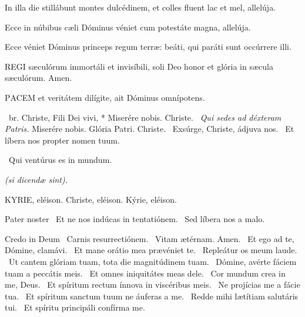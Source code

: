 
  In illa die stillábunt montes dulcédinem, et colles fluent lac et mel, allelúja.

  Ecce in núbibus cæli Dóminus véniet cum potestáte magna, allelúja.

  Ecce véniet Dóminus princeps regum terræ: beáti, qui paráti sunt occúrrere illi.



\lettrine[lines=2]{R}{EGI} sæculórum immortáli et invisíbili, soli Deo honor et glória in sæcula sæculórum. Amen.



\lettrine[lines=2]{P}{ACEM} et veritátem dilígite, ait Dóminus omnípotens.

\R\ br. Christe, Fili Dei vivi, * Miserére nobis. Christe. \V\ \textit{Qui sedes ad déxteram Patris.} Miserére nobis. Glória Patri. Christe. \V\ Exsúrge, Christe, ádjuva nos. \R\ Et líbera nos propter nomen tuum.

 \V\ Qui ventúrus es in mundum.


\textit{(si dicendæ sint).}

KYRIE, eléison. Christe, eléison. Kýrie, eléison.

Pater noster  \V\ Et ne nos indúcas in tentatiónem. \R\ Sed líbera nos a malo.

Credo in Deum  \V\ Carnis resurrectiónem. \R\ Vitam ætérnam. Amen. \V\ Et ego ad te, Dómine, clamávi. \R\ Et mane orátio mea prævéniet te. \V\ Repleátur os meum laude. \R\ Ut cantem glóriam tuam, tota die magnitúdinem tuam. \V\ Dómine, avérte fáciem tuam a peccátis meis. \R\ Et omnes iniquitátes meas dele. \V\ Cor mundum crea in me, Deus. \R\ Et spíritum rectum ínnova in viscéribus meis. \V\ Ne projícias me a fácie tua. \R\ Et spíritum sanctum tuum ne áuferas a me. \V\ Redde mihi lætítiam salutáris tui. \R\ Et spíritu principáli confírma me.

